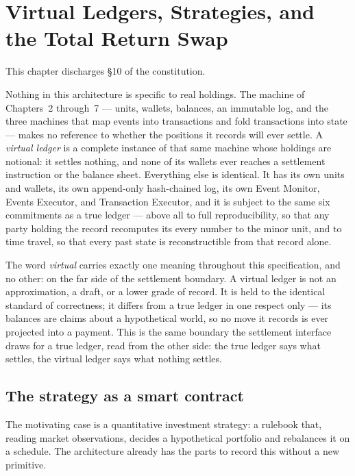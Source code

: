\section{Virtual Ledgers, Strategies, and the Total Return Swap}
\label{ch:virtual}

This chapter discharges §10 of the constitution.

Nothing in this architecture is specific to real holdings. The machine of
Chapters~2 through~7 --- units, wallets, balances, an immutable log, and the
three machines that map events into transactions and fold transactions into
state --- makes no reference to whether the positions it records will ever
settle. A \emph{virtual ledger} is a complete instance of that same machine
whose holdings are notional: it settles nothing, and none of its wallets ever
reaches a settlement instruction or the balance sheet. Everything else is
identical. It has its own units and wallets, its own append-only hash-chained
log, its own Event Monitor, Events Executor, and Transaction Executor, and it is
subject to the same six commitments as a true ledger --- above all to full
reproducibility, so that any party holding the record recomputes its every
number to the minor unit, and to time travel, so that every past state is
reconstructible from that record alone.

The word \emph{virtual} carries exactly one meaning throughout this
specification, and no other: on the far side of the settlement boundary. A
virtual ledger is not an approximation, a draft, or a lower grade of record. It
is held to the identical standard of correctness; it differs from a true ledger
in one respect only --- its balances are claims about a hypothetical world, so
no move it records is ever projected into a payment. This is the same boundary
the settlement interface draws for a true ledger, read from the other side: the
true ledger says what settles, the virtual ledger says what nothing settles.

\subsection{The strategy as a smart contract}

The motivating case is a quantitative investment strategy: a rulebook that,
reading market observations, decides a hypothetical portfolio and rebalances it
on a schedule. The architecture already has the parts to record this without a
new primitive.

